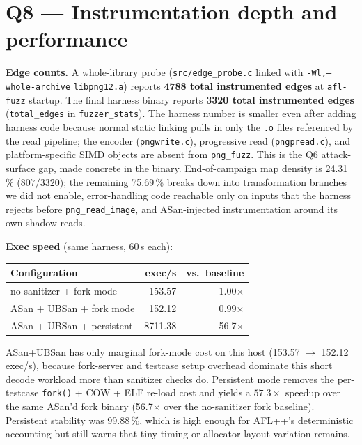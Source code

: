 \documentclass[letterpaper,twocolumn,10pt]{article}
\begin{document}
\section{Q8 — Instrumentation depth and performance}
\label{sec:q8}
\textbf{Edge counts.} A whole-library probe
(\texttt{src/edge\_probe.c} linked with \texttt{-Wl,--whole-archive}
\texttt{libpng12.a}) reports \textbf{4788 total instrumented edges} at
\texttt{afl-fuzz} startup. The final harness binary reports \textbf{3320 total
instrumented edges} (\texttt{total\_edges} in \texttt{fuzzer\_stats}). The
harness number is smaller even after adding harness code because normal static
linking pulls in only the \texttt{.o} files referenced by the read pipeline; the
encoder (\texttt{pngwrite.c}), progressive read (\texttt{pngpread.c}), and
platform-specific SIMD objects are absent from \texttt{png\_fuzz}. This is the
Q6 attack-surface gap, made concrete in the binary. End-of-campaign map density is 24.31\,\%
($807/3320$); the remaining 75.69\,\% breaks down into transformation branches
we did not enable, error-handling code reachable only on inputs that the
harness rejects before \texttt{png\_read\_image}, and ASan-injected
instrumentation around its own shadow reads.

\textbf{Exec speed} (same harness, 60\,s each):
\begin{center}\small
\begin{tabular}{@{}lrr@{}}
\toprule
Configuration                & exec/s & vs.\ baseline\\
\midrule
no sanitizer + fork mode     & 153.57 & 1.00$\times$\\
ASan + UBSan + fork mode     & 152.12 & 0.99$\times$\\
ASan + UBSan + persistent    & 8711.38 & 56.7$\times$\\
\bottomrule
\end{tabular}
\end{center}
ASan+UBSan has only marginal fork-mode cost on this host (153.57 $\to$ 152.12
exec/s), because fork-server and testcase setup overhead dominate this short
decode workload more than sanitizer checks do. Persistent mode removes the
per-testcase \texttt{fork()} + COW + ELF re-load cost and yields a
$\mathbf{57.3\times}$ speedup over the same ASan'd fork binary (56.7$\times$
over the no-sanitizer fork baseline). Persistent stability was 99.88\,\%,
which is high enough for AFL++'s deterministic accounting but still warns that
tiny timing or allocator-layout variation remains.
\end{document}
